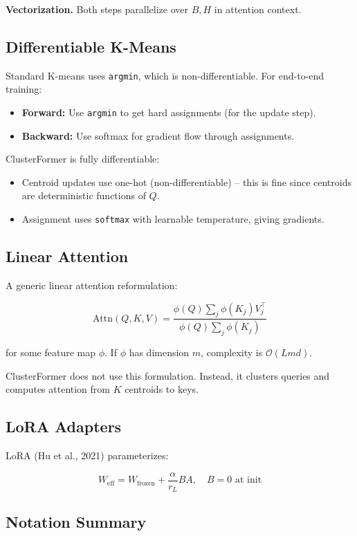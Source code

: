 \textbf{Vectorization.} Both steps parallelize over $B, H$ in attention context.

\subsection{Differentiable K-Means}

Standard K-means uses \texttt{argmin}, which is non-differentiable. For 
end-to-end training:

\begin{itemize}
\item \textbf{Forward:} Use \texttt{argmin} to get hard assignments (for the update step).
\item \textbf{Backward:} Use softmax for gradient flow through assignments.

\end{itemize}
ClusterFormer is fully differentiable:
\begin{itemize}
\item Centroid updates use one-hot (non-differentiable) -- this is fine since
  centroids are deterministic functions of $Q$.
\item Assignment uses \texttt{softmax} with learnable temperature, giving gradients.

\end{itemize}
\subsection{Linear Attention}

A generic linear attention reformulation:

\[
\text{Attn}(Q, K, V) = \frac{\phi(Q) \sum_j \phi(K_j) V_j^\top}{\phi(Q) \sum_j \phi(K_j)}
\]

for some feature map $\phi$. If $\phi$ has dimension $m$, complexity is 
$\mathcal{O}(L m d)$.

ClusterFormer does not use this formulation. Instead, it clusters queries 
and computes attention from $K$ centroids to keys.

\subsection{LoRA Adapters}

LoRA (Hu et al., 2021) parameterizes:

\[
W_\text{eff} = W_\text{frozen} + \frac{\alpha}{r_L} B A, \quad B = 0 \text{ at init}
\]

\subsection{Notation Summary}

